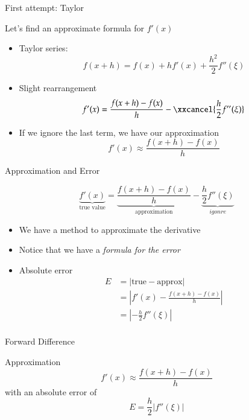 \documentclass[10pt]{beamer}
\begin{document}
\begin{frame}{First attempt: Taylor}

Let's find an approximate formula for $f'(x)$\\[4mm]

\begin{itemize}
    \item Taylor series:
    \begin{equation*}
      f(x+h) = f(x) + h f'(x) + \frac{h^2}{2}f''(\xi)
    \end{equation*}
    \item Slight rearrangement
    \begin{equation*}
      f'(x) = \frac{f(x+h)-f(x)}{h} - \xxcancel{\frac{h}{2}f''(\xi)}
    \end{equation*}
    \item<2-> If we ignore the last term, we have our approximation 
        $$
        f'(x) \approx \frac{f(x+h)-f(x)}{h}
        $$
\end{itemize}
\end{frame}

\begin{frame}{Approximation and Error}

    \begin{equation*}
      \underbrace{f'(x)}_{\textrm{true value}} = \underbrace{\frac{f(x+h)-f(x)}{h}}_{\textrm{approximation}} - \underbrace{\frac{h}{2}f''(\xi)}_{igonre}
    \end{equation*}
    
    \begin{itemize}
        \item We have a method to approximate the derivative 
        \item Notice that we have a \textit{formula for the error}
        \item Absolute error 
        \begin{align*}
        E &= |\text{true} - \text{approx}|\\
           &= \left|f'(x) - \tfrac{f(x+h)-f(x)}{h} \right|\\
           &= \left|-\frac{h}{2}f''(\xi) \right|\\
        \end{align*}
    \end{itemize}
\end{frame}
\begin{frame}{Forward Difference}

Approximation
\begin{equation*}
  f'(x) \approx \frac{f(x+h)-f(x)}{h}
\end{equation*}
with an absolute error of
\begin{equation*}
  E=\frac{h}{2}|f''(\xi)| 
\end{equation*}


\end{frame}
\end{document}
